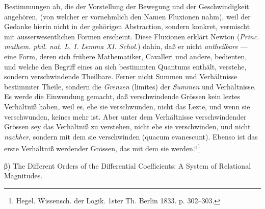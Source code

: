 \documentclass[12pt,a4paper,openany]{book}
\newcommand{\opage}[1]{\marginnote{\footnotesize\textit{[#1]}}}
\begin{document}
\setcounter{footnote}{0}%
\opage{83}Bestimmungen ab, die der Vorstellung der Bewegung und
der Geschwindigkeit angehören, (von welcher er vornehmlich
den Namen Fluxionen nahm), weil der Gedanke hierin
nicht in der gehörigen Abstraction, sondern konkret, vermischt
mit ausserwesentlichen Formen erscheint. Diese Fluxionen
erklärt Newton (\textit{Princ. mathem. phil. nat. L. I. Lemma XI.
Schol.}) dahin, daß er nicht \emph{untheilbare} --- eine Form,
deren sich frühere Mathematiker, Cavalleri und andere, bedienten,
und welche den Begriff eines an sich bestimmten
Quantums enthält, verstehe, sondern verschwindende Theilbare.
Ferner nicht Summen und Verhältnisse bestimmter
\setcounter{footnote}{0}%
\opage{84}Theile, sondern die \emph{Grenzen} (limites) der \emph{Summen} und
Verhältnisse. Es werde die Einwendung gemacht, daß verschwindende
Grössen kein leztes Verhältniß haben, weil
es, ehe sie verschwunden, nicht das Lezte, und wenn sie verschwunden,
keines mehr ist. Aber unter dem Verhältnisse
verschwindender Grössen sey das Verhältniß zu verstehen,
nicht ehe sie verschwinden, und nicht \emph{nachher}, sondern
mit dem sie verschwinden (quacum evanescunt). Ebenso
ist das erste Verhältniß werdender Grössen, das mit dem
sie werden.“\footnote[1]{Hegel. Wissensch. der Logik. 1ster Th. Berlin 1833. p. 302--303.}


\begin{center}β) The Different Orders of the Differential Coefficients: A System of Relational Magnitudes.\end{center}
\end{document}

